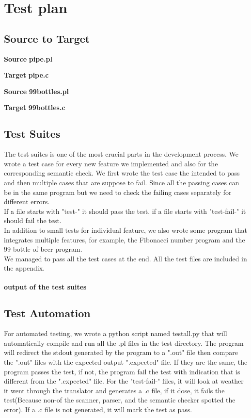 \documentclass[./Report_main.tex]{subfiles}
\begin{document}


\chapter{Test plan}
\section{Source to Target}
\textbf{Source}
\textbf{pipe.pl}

\textbf{Target}
\textbf{pipe.c}

\textbf{Source}
\textbf{99bottles.pl}

\textbf{Target}
\textbf{99bottles.c}

\section{Test Suites}
The test suites is one of the most crucial parts in the development process. We wrote a test case for every new feature we implemented and also for the corresponding semantic check. We first wrote the test case the intended to pass and then multiple cases that are suppose to fail. Since all the passing cases can be in the same program but we need to check the failing cases separately for different errors.\\
If a file starts with "test-" it should pass the test, if a file starts with "test-fail-" it should fail the test.\\
In addition to small tests for individual feature, we also wrote some program that integrates multiple features, for example, the Fibonacci number program and the 99-bottle of beer program.\\
We managed to pass all the test cases at the end. All the test files are included in the appendix.\\
\vspace{5mm}\\
\textbf{output of the test suites}

\section{Test Automation}
For automated testing, we wrote a python script named testall.py that will automatically compile and run all the .pl files in the test directory. The program will redirect the stdout generated by the program to a ".out" file then compare the ".out" files with the expected output ".expected" file. If they are the same, the program passes the test, if not, the program fail the test with indication that is different from the ".expected" file. For the "test-fail-" files, it will look at weather it went through the translator and generates a .c file, if it dose, it fails the test(Because non-of the scanner, parser, and the semantic checker spotted the error). If a .c file is not generated, it will mark the test as pass.\\
\end{document}
